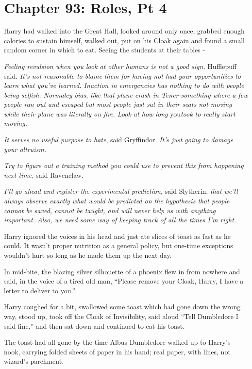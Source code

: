 \chapter{Chapter 93: Roles, Pt 4}
Harry had walked into the Great Hall, looked around only once, grabbed
enough calories to sustain himself, walked out, put on his Cloak again
and found a small random corner in which to eat. Seeing the students at
their tables -

\emph{Feeling revulsion when you look at other humans is not a good
sign,} Hufflepuff said. \emph{It's not reasonable to blame them for
having not had your opportunities to learn what you've learned. Inaction
in emergencies has nothing to do with people being selfish. Normalcy
bias, like that plane crash in Tener-something where a few people ran
out and escaped but most people just sat in their seats not moving while
their plane was literally on fire. Look at how long} you\emph{took to
really start moving.}

\emph{It serves no useful purpose to hate}, said Gryffindor. \emph{It's
just going to damage your altruism.}

\emph{Try to figure out a training method you could use to prevent this
from happening next time,} said Ravenclaw.

\emph{I'll go ahead and register the experimental prediction,} said
Slytherin, \emph{that we'll always observe exactly what would be
predicted on the hypothesis that people cannot be saved, cannot be
taught, and will never help us with anything important. Also, we need
some way of keeping track of all the times I'm right.}

Harry ignored the voices in his head and just ate slices of toast as
fast as he could. It wasn't proper nutrition as a general policy, but
one-time exceptions wouldn't hurt so long as he made them up the next
day.

In mid-bite, the blazing silver silhouette of a phoenix flew in from
nowhere and said, in the voice of a tired old man, ``Please remove your
Cloak, Harry, I have a letter to deliver to you.''

Harry coughed for a bit, swallowed some toast which had gone down the
wrong way, stood up, took off the Cloak of Invisibility, said aloud
``Tell Dumbledore I said fine,'' and then sat down and continued to eat
his toast.

The toast had all gone by the time Albus Dumbledore walked up to Harry's
nook, carrying folded sheets of paper in his hand; real paper, with
lines, not wizard's parchment.

